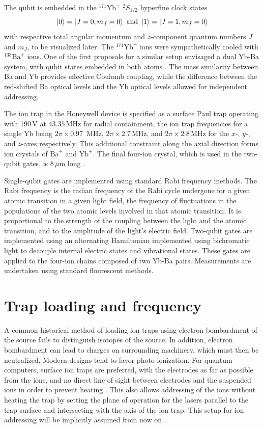 \documentclass[12pt,a4paper]{amsart}
\numberwithin{equation}{section}
\theoremstyle{plain}
\theoremstyle{definition}
\begin{document}
The qubit is embedded in the ${}^{171}\mathrm{Yb}^+$ ${}^2S_{1/2}$ hyperfine clock states
\begin{equation}\label{E:HypClkSt}
\ket{0} = \ket{J=0,m_J=0}\mbox{ and }\ket{1}=\ket{J=1,m_J=0}
\end{equation} 
with respective total angular momentum and $z$-component quantum numbers $J$ and $m_J$, to be visualized later. The ${}^{171}\mathrm{Yb}^+$ ions were sympathetically cooled with ${}^{138}\mathrm{Ba}^+$ ions. One of the first proposals for a similar setup envisaged a dual Yb-Ba system, with qubit states embedded in both atoms \cite{origQuanIoni}. The mass similarity between Ba and Yb provides effective Coulomb coupling, while the difference between the red-shifted Ba optical levels and the Yb optical levels allowed for independent addressing.


The ion trap in the Honeywell device is specified as a surface Paul trap operating with 190\,V at $43.35\,$MHz for radial containment, the ion trap frequencies for a single Yb being $2\pi\times 0.97\,$ MHz, $2\pi\times 2.7\,$MHz, and $2\pi\times 2.8\,$MHz for the $x$-, $y$-, and $z$-axes respectively. This additional constraint along the axial direction forms ion crystals of $\mathrm{Ba}^+$ and $\mathrm{Yb}^+$. The final four-ion crystal, which is used in the two-qubit gates, is $8\,\mu$m long \cite{honeywell}. 


Single-qubit gates are implemented using standard Rabi frequency methods. The Rabi frequency is the radian frequency of the Rabi cycle undergone for a given atomic transition in a given light field, the frequency of fluctuations in the populations of the two atomic levels involved in that atomic transition. It is proportional to the strength of the coupling between the light and the atomic transition, and to the amplitude of the light's electric field. Two-qubit gates are implemented using an alternating Hamiltonian implemented using bichromatic light to decouple internal electric states and vibrational states. These gates are applied to the four-ion chains composed of two Yb-Ba pairs. Measurements are undertaken using standard flourescent methods.


\section{Trap loading and frequency}


A common historical method of loading ion traps using electron bombardment of the source fails to distinguish isotopes of the source. In addition, electron bombardment can lead to charges on surrounding machinery, which must then be neutralized. Modern designs tend to favor photo-ionization. For quantum computers, surface ion traps are preferred, with the electrodes as far as possible from the ions, and no direct line of sight between electrodes and the suspended ions in order to prevent heating \cite{quanCopyCat}. This also allows addressing of the ions without heating the trap by setting the plane of operation for the lasers parallel to the trap surface and intersecting with the axis of the ion trap. This setup for ion addressing will be implicitly assumed from now on \cite{miscQuanPap2}.
\end{document}
